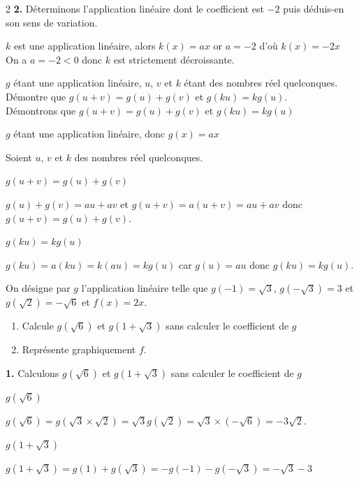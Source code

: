 \begin{multicols*}{2}
 	\textbf{2.} Déterminons l'application linéaire dont le coefficient est $ -2 $ puis déduis-en son sens de variation.
 	
 	$k$ est une application linéaire, alors $k(x)=ax$ or $a=-2$ d'où $k(x)=-2x$\\
 	On a $a=-2<0$ donc $k$ est strictement décroissante.
 	
 	$ g $ étant une application linéaire, $ u $, $ v $ et $ k $ étant des nombres réel quelconques. Démontre que $ g(u+v)=g(u)+g(v) $ et $ g(ku)=kg(u) $. \\
 	\dure 
 	\resul
 	Démontrons que $g(u+v)=g(u)+g(v)$ et $ g(ku)=kg(u) $
 	
 	$g$ étant une application linéaire, donc $g(x)=ax$
 	
 	Soient $u$, $v$ et $k$  des nombres réel quelconques.
 	
 	 $g(u+v)=g(u)+g(v)$
 	
 	$g(u)+g(v)=au+av$ et   $g(u+v)=a(u+v)=au+av$ donc $g(u+v)=g(u)+g(v)$.
 	
 	 $g(ku)=kg(u)$
 	
 	$ g(ku)=a(ku)=k(au)=kg(u) $ car $g(u) =au$ donc $g(ku)=kg(u)$.
 	
 	On désigne par $ g $ l'application linéaire telle que $g(-1)=\sqrt{3}$, $g(-\sqrt{3})=3 $ et $ g(\sqrt{2})=-\sqrt{6} $ et $ f(x)=2x $.
 	\begin{enumerate}
 		\item  Calcule $ g(\sqrt{6}) $ et $ g(1+\sqrt{3}) $ sans calculer le coefficient de $g$
 		\item Représente graphiquement $f$.
 	\end{enumerate}
 	\dure
 	\resul
 	\textbf{1.} Calculons $ g(\sqrt{6}) $ et $ g(1+\sqrt{3}) $ sans calculer le coefficient de $g$
 	
 	 $ g(\sqrt{6}) $
 	
 	$ g(\sqrt{6})= g(\sqrt{3}\times\sqrt{2})=\sqrt{3}g(\sqrt{2})= \sqrt{3}\times(-\sqrt{6})=-3\sqrt{2}$.
 	
 	 $ g(1+\sqrt{3})$
 	
 	$ g(1+\sqrt{3})=g(1)+g(\sqrt{3})=-g(-1)-g(-\sqrt{3})=-\sqrt{3}-3$
 	

\end{multicols*}
